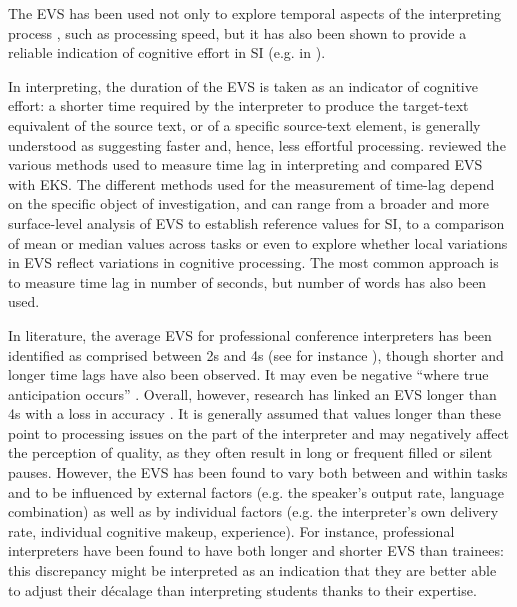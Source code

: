 The EVS has been used not only to explore temporal aspects of the interpreting process \citep[117]{pochhacker_introducing_2004}, such as processing speed, but it has also been shown to provide a reliable indication of cognitive effort in SI (e.g. in \citealt{treisman_effects_1965,barik_description_1971,shlesinger_corpus-based_1998,alvstad_time_2011}).

In interpreting, the duration of the EVS is taken as an indicator of cognitive effort: a shorter time required by the interpreter to produce the target-text equivalent of the source text, or of a specific source-text element, is generally understood as suggesting faster and, hence, less effortful processing. \citet{alvstad_time_2011} reviewed the various methods used to measure time lag in interpreting and compared EVS with EKS. The different methods used for the measurement of time-lag depend on the specific object of investigation, and can range from a broader and more surface-level analysis of EVS to establish reference values for SI, to a comparison of mean or median values across tasks or even to explore whether local variations in EVS reflect variations in cognitive processing. The most common approach is to measure time lag in number of seconds, but number of words has also been used.

In literature, the average EVS for professional conference interpreters has been identified as comprised between 2s and 4s (see for instance \citealt{barik_simultaneous_1973,lederer_simultaneous_1978,oleron_research_2002,christoffels_components_2004,defrancq_corpus-based_2015,alvstad_time_2011}), though shorter and longer time lags have also been observed. It may even be negative ``where true anticipation occurs'' \citep[419]{timarova_time_2015}. Overall, however, research has linked an EVS longer than 4s with a loss in accuracy \citep{lee_ear_2002,lee_tail--tail_2003,timarova_simultaneous_2014}. It is generally assumed that values longer than these point to processing issues on the part of the interpreter and may negatively affect the perception of quality, as they often result in long or frequent filled or silent pauses. However, the EVS has been found to vary both between and within tasks and to be influenced by external factors (e.g. the speaker's output rate, language combination) as well as by individual factors (e.g. the interpreter's own delivery rate, individual cognitive makeup, experience). For instance, professional interpreters have been found to have both longer \citep{englund_dimitrova_searching_2000} and shorter EVS \citep{timarova_simultaneous_2014} than trainees: this discrepancy might be interpreted as an indication that they are better able to adjust their décalage than interpreting students thanks to their expertise.


